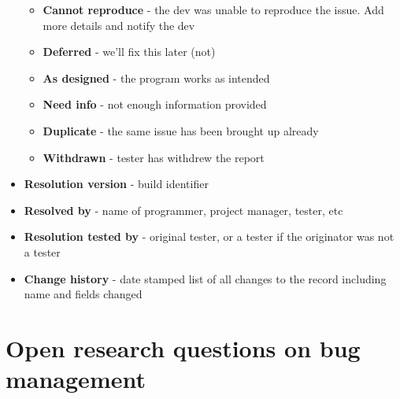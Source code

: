 \documentclass[12pt]{book}
\begin{document}
\begin{itemize}
\begin{itemize}
        \item \textbf{Cannot reproduce} - the dev was unable to reproduce the issue. Add more details and notify the dev
        \item \textbf{Deferred} - we'll fix this later (not)
        \item \textbf{As designed} - the program works as intended
        \item \textbf{Need info} - not enough information provided
        \item \textbf{Duplicate} - the same issue has been brought up already
        \item \textbf{Withdrawn} - tester has withdrew the report
    \end{itemize}

    \item \textbf{Resolution version} - build identifier
    \item \textbf{Resolved by} - name of programmer, project manager, tester, etc
    \item \textbf{Resolution tested by} - original tester, or a tester if the originator was not a tester
    \item \textbf{Change history} - date stamped list of all changes to the record including name and fields changed

\end{itemize}

\chapter{Open research questions on bug management}
\end{document}
